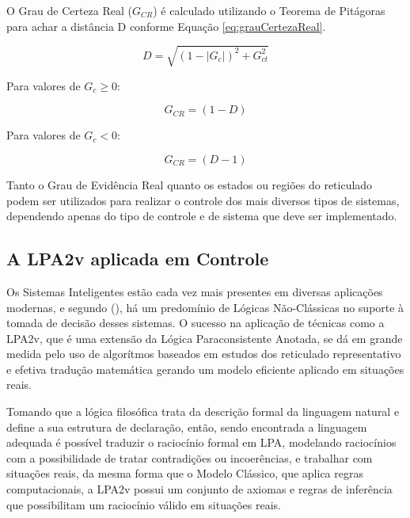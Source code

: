O Grau de Certeza Real ($G_{CR}$) 
é calculado utilizando o Teorema de Pitágoras para achar a distância D 
conforme Equação \ref{eq:grauCertezaReal}. 

\begin{center}
\begin{equation}
D = \sqrt{(1-|G_c|)^2+G_{ct}^2}
\label{eq:grauCertezaReal}
\end{equation}
\end{center}

Para valores de $G_c \geq 0$: 

\begin{center}
\begin{equation}
G_{CR} = (1-D)
\end{equation}
\end{center}

Para valores de $G_c < 0$:

\begin{center}
\begin{equation}
G_{CR} = (D-1)
\end{equation}
\end{center}


Tanto o Grau de Evidência Real quanto os estados ou regiões do reticulado 
podem ser utilizados para realizar o controle dos mais diversos tipos de sistemas, 
dependendo apenas do tipo de controle e de sistema que deve ser implementado. 

\subsection{A LPA2v aplicada em Controle}

Os Sistemas Inteligentes estão cada vez mais presentes em diversas aplicações modernas, 
e segundo \citeauthor{JISF2011}(\citeyear{JISF2011}), 
há um predomínio de Lógicas Não-Clássicas no suporte à tomada de decisão desses sistemas. 
O sucesso na aplicação de técnicas como a LPA2v, 
que é uma extensão da Lógica Paraconsistente Anotada, 
se dá em grande medida pelo uso de 
algorítmos baseados em estudos dos reticulado representativo e 
efetiva tradução matemática 
gerando um modelo eficiente aplicado em situações reais.

Tomando que a lógica filosófica trata da descrição formal da linguagem natural 
e define a sua estrutura de declaração, então, 
sendo encontrada a linguagem adequada 
é possível traduzir o raciocínio formal em LPA, 
modelando raciocínios com a possibilidade de 
tratar contradições ou incoerências, 
e trabalhar com situações reais, 
da mesma forma que o Modelo Clássico, 
que aplica regras computacionais, 
a LPA2v possui um conjunto de axiomas e regras de inferência 
que possibilitam um raciocínio válido em situações reais.


